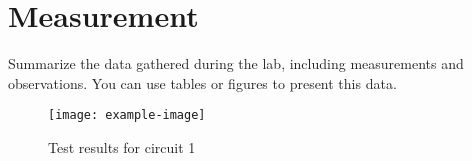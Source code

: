 \documentclass[a4paper,12pt]{article}
\begin{document}
\section{Measurement}
Summarize the data gathered during the lab, including measurements and observations. You can use tables or figures to present this data.

\begin{figure}[h!]
    \centering
    \texttt{[image: example-image]} %
    \caption{Test results for circuit 1}
    \label{fig:circuit1}
\end{figure}


\newpage

\end{document}
